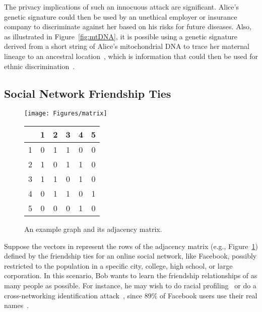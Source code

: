 \documentclass{article}
\begin{document}
The privacy implications of such an innocuous attack are significant.  
Alice's genetic signature could then be used by an unethical employer or 
insurance company to discriminate against her based on his risks for future diseases.
Also, as illustrated in Figure~\ref{fig:mtDNA}, it is possible using a genetic signature derived from
a short string of Alice's mitochondrial DNA to trace her 
maternal lineage to an 
ancestral location~\cite{brb-gppd-05,ps-mdhe-05}, which is
information that could then be used for ethnic 
discrimination~\cite{harihara92}.

\subsection{Social Network Friendship Ties}

\begin{figure}[]
\begin{minipage}[b]{0.5\linewidth}\centering
\texttt{[image: Figures/matrix]}
\end{minipage}
\begin{minipage}[b]{0.5\linewidth}
\begin{tabular}{c|ccccc}
 & 1 & 2 & 3 & 4 & 5 \\
\hline
1 & 0 & 1 & 1 & 0 & 0 \\
2 & 1 & 0 & 1 & 1 & 0 \\
3 & 1 & 1 & 0 & 1 & 0 \\
4 & 0 & 1 & 1 & 0 & 1 \\
5 & 0 & 0 & 0 & 1 & 0 
\end{tabular}
\end{minipage}
\caption{An example graph and its adjacency matrix.}
\label{fig:matrix}
\end{figure}

Suppose the vectors in  represent the rows of the 
adjacency matrix (e.g., Figure~\ref{fig:matrix}) defined by the friendship ties for an online social network, 
like Facebook, possibly restricted to the population in a
specific city, college, high school, or large corporation.
In this scenario, Bob wants to learn the friendship relationships of
as many people as possible. For instance, he may wish to do racial
profiling~\cite{Lewis2008330} or do a cross-networking
identification attack~\cite{nv-dsn-09}, since 
89\% of Facebook users use their real names~\cite{gah-irpos-05}.
\end{document}
